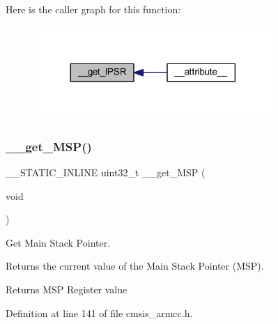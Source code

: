 Here is the caller graph for this function\+:
\nopagebreak
\begin{figure}[H]
\begin{center}
\leavevmode
\includegraphics[width=257pt]{group___c_m_s_i_s___core___reg_acc_functions_ga2c18685a915eb9b7513a907c2b866636_icgraph}
\end{center}
\end{figure}
\mbox{\label{group___c_m_s_i_s___core___reg_acc_functions_gac5267c10c9b15b5349eea0a959ea014c}} 
\subsubsection{\texorpdfstring{\+\_\+\+\_\+get\+\_\+\+M\+S\+P()}{\_\_get\_MSP()}}
{\footnotesize\ttfamily \+\_\+\+\_\+\+S\+T\+A\+T\+I\+C\+\_\+\+I\+N\+L\+I\+NE uint32\+\_\+t \+\_\+\+\_\+get\+\_\+\+M\+SP (\begin{DoxyParamCaption}\item[{void}]{ }\end{DoxyParamCaption})}



Get Main Stack Pointer. 

Returns the current value of the Main Stack Pointer (M\+SP). \begin{DoxyReturn}{Returns}
M\+SP Register value 
\end{DoxyReturn}


Definition at line 141 of file cmsis\+\_\+armcc.\+h.

